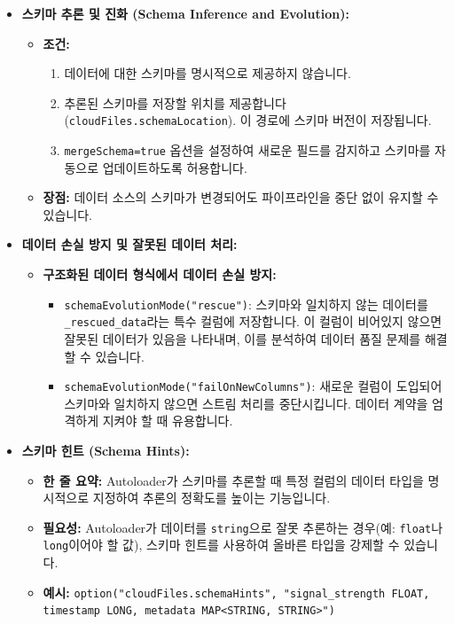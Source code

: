 \documentclass[11pt,a4paper]{article}
\theoremstyle{definition}
\begin{document}
\begin{itemize}
    \item \textbf{스키마 추론 및 진화 (Schema Inference and Evolution):}
    \begin{itemize}
        \item \textbf{조건:}
        \begin{enumerate}
            \item 데이터에 대한 스키마를 명시적으로 제공하지 않습니다.
            \item 추론된 스키마를 저장할 위치를 제공합니다 (\texttt{cloudFiles.schemaLocation}). 이 경로에 스키마 버전이 저장됩니다.
            \item \texttt{mergeSchema=true} 옵션을 설정하여 새로운 필드를 감지하고 스키마를 자동으로 업데이트하도록 허용합니다.
        \end{enumerate}
        \item \textbf{장점:} 데이터 소스의 스키마가 변경되어도 파이프라인을 중단 없이 유지할 수 있습니다.
    \end{itemize}
    \item \textbf{데이터 손실 방지 및 잘못된 데이터 처리:}
    \begin{itemize}
        \item \textbf{구조화된 데이터 형식에서 데이터 손실 방지:}
        \begin{itemize}
            \item \texttt{schemaEvolutionMode("rescue")}: 스키마와 일치하지 않는 데이터를 \texttt{_rescued_data}라는 특수 컬럼에 저장합니다. 이 컬럼이 비어있지 않으면 잘못된 데이터가 있음을 나타내며, 이를 분석하여 데이터 품질 문제를 해결할 수 있습니다.
            \item \texttt{schemaEvolutionMode("failOnNewColumns")}: 새로운 컬럼이 도입되어 스키마와 일치하지 않으면 스트림 처리를 중단시킵니다. 데이터 계약을 엄격하게 지켜야 할 때 유용합니다.
        \end{itemize}
    \end{itemize}
    \item \textbf{스키마 힌트 (Schema Hints):}
    \begin{itemize}
        \item \textbf{한 줄 요약:} Autoloader가 스키마를 추론할 때 특정 컬럼의 데이터 타입을 명시적으로 지정하여 추론의 정확도를 높이는 기능입니다.
        \item \textbf{필요성:} Autoloader가 데이터를 \texttt{string}으로 잘못 추론하는 경우(예: \texttt{float}나 \texttt{long}이어야 할 값), 스키마 힌트를 사용하여 올바른 타입을 강제할 수 있습니다.
        \item \textbf{예시:} \texttt{option("cloudFiles.schemaHints", "signal_strength FLOAT, timestamp LONG, metadata MAP<STRING, STRING>")}
    \end{itemize}
\end{itemize}
\end{document}
